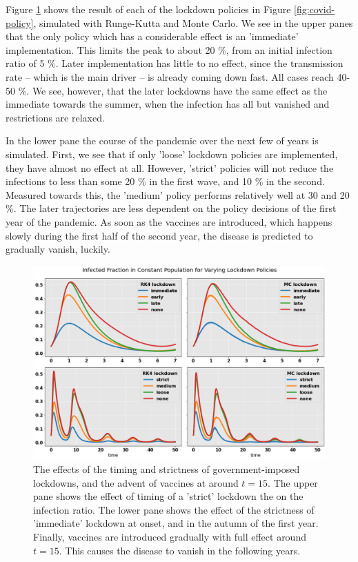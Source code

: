 \documentclass[]{article}
\begin{document}
Figure \ref{fig:covid-infection-sim} shows the result of each of the lockdown policies in Figure \ref{fig:covid-policy}, simulated with Runge-Kutta and Monte Carlo. We see in the upper panes that the only policy which has a considerable effect is an 'immediate' implementation. This limits the peak to about 20 \%, from an initial infection ratio of 5 \%. Later implementation has little to no effect, since the transmission rate -- which is the main driver -- is already coming down fast. All cases reach 40-50 \%. We see, however, that the later lockdowns have the same effect as the immediate towards the summer, when the infection has all but vanished and restrictions are relaxed.

In the lower pane the course of the pandemic over the next few of years is simulated. First, we see that if only 'loose' lockdown policies are implemented, they have almost no effect at all. However, 'strict' policies will not reduce the infections to less than some 20 \% in the first wave, and 10 \% in the second. Measured towards this, the 'medium' policy performs relatively well at 30 and 20 \%. The later trajectories are less dependent on the policy decisions of the first year of the pandemic. As soon as the vaccines are introduced, which happens slowly during the first half of the second year, the disease is predicted to gradually vanish, luckily.

\begin{figure}[!h]
	\centering
	\includegraphics[width=1\linewidth]{./figs/covid-infection-sim.png}
	\caption{The effects of the timing and strictness of government-imposed lockdowns, and the advent of vaccines at around $t=15$. The upper pane shows the effect of timing of a 'strict' lockdown the on the infection ratio. The lower pane shows the effect of the strictness of 'immediate' lockdown at onset, and in the autumn of the first year. Finally, vaccines are introduced gradually with full effect around $t=15$. This causes the disease to vanish in the following years.}
	\label{fig:covid-infection-sim}
\end{figure}
\end{document}
